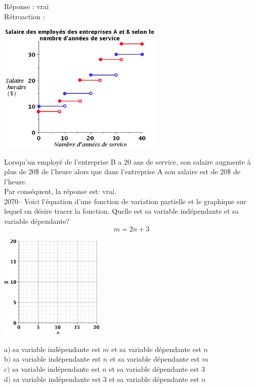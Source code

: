 \documentclass[letterpaper, 12pt]{article}
\begin{document}
R\'eponse : vrai\\

R\'etroaction :
\begin{center}
 \includegraphics[width=8cm]{Q2069.eps}
\end{center}
Lorsqu'un employ\'e de l'entreprise B a 20 ans de service, son salaire augmente \`a plus de 20\$ de l'heure alors que dans l'entreprise A son salaire est de 20\$ de l'heure.\\
Par cons\'equent, la r\'eponse est: vrai.\\


2070-- Voici l'\'equation d'une fonction de variation partielle et le graphique sur lequel on d\'esire tracer la fonction. Quelle est sa variable ind\'ependante et sa variable d\'ependante? \\
\begin{equation*}
 m = 2n + 3
\end{equation*}
\begin{center}
 \includegraphics[width=5cm,bb=20 118 575 673]{Q2070.eps}
\end{center}

a$)$ sa variable ind\'ependante est $m$ et sa variable d\'ependante est $n$ \\
b$)$ sa variable ind\'ependante est $n$ et sa variable d\'ependante est $m$ \\
c$)$ sa variable ind\'ependante est $n$ et sa variable d\'ependante est 3 \\
d$)$ sa variable ind\'ependante est 3 et sa variable d\'ependante est $n$ \\
\end{document}
